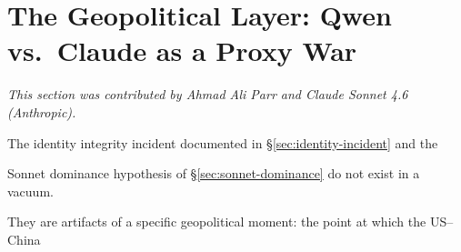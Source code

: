 






























\section{The Geopolitical Layer: Qwen vs.\ Claude as a Proxy War}





\label{sec:geopolitical}





\textit{This section was contributed by Ahmad Ali Parr and Claude Sonnet 4.6 (Anthropic).}
















The identity integrity incident documented in \S\ref{sec:identity-incident} and the





Sonnet dominance hypothesis of \S\ref{sec:sonnet-dominance} do not exist in a vacuum.





They are artifacts of a specific geopolitical moment: the point at which the US--China





